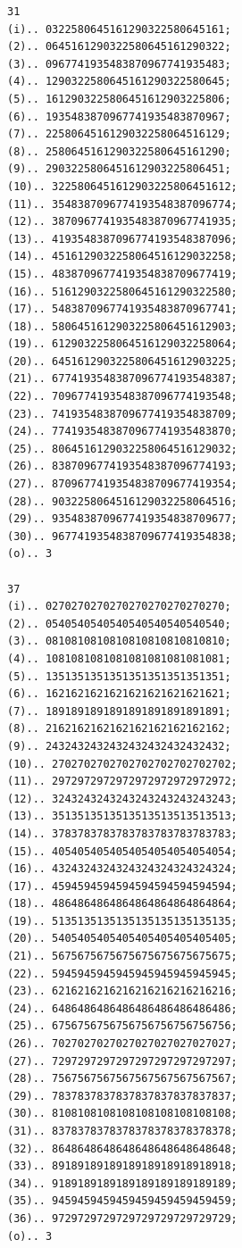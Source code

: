 \documentclass[10pt,a4paper]{article}
\begin{document}
\begin{verbatim}
31
(i).. 0322580645161290322580645161;
(2).. 0645161290322580645161290322;
(3).. 0967741935483870967741935483;
(4).. 1290322580645161290322580645;
(5).. 1612903225806451612903225806;
(6).. 1935483870967741935483870967;
(7).. 2258064516129032258064516129;
(8).. 2580645161290322580645161290;
(9).. 2903225806451612903225806451;
(10).. 3225806451612903225806451612;
(11).. 3548387096774193548387096774;
(12).. 3870967741935483870967741935;
(13).. 4193548387096774193548387096;
(14).. 4516129032258064516129032258;
(15).. 4838709677419354838709677419;
(16).. 5161290322580645161290322580;
(17).. 5483870967741935483870967741;
(18).. 5806451612903225806451612903;
(19).. 6129032258064516129032258064;
(20).. 6451612903225806451612903225;
(21).. 6774193548387096774193548387;
(22).. 7096774193548387096774193548;
(23).. 7419354838709677419354838709;
(24).. 7741935483870967741935483870;
(25).. 8064516129032258064516129032;
(26).. 8387096774193548387096774193;
(27).. 8709677419354838709677419354;
(28).. 9032258064516129032258064516;
(29).. 9354838709677419354838709677;
(30).. 9677419354838709677419354838;
(o).. 3

37
(i).. 0270270270270270270270270270;
(2).. 0540540540540540540540540540;
(3).. 0810810810810810810810810810;
(4).. 1081081081081081081081081081;
(5).. 1351351351351351351351351351;
(6).. 1621621621621621621621621621;
(7).. 1891891891891891891891891891;
(8).. 2162162162162162162162162162;
(9).. 2432432432432432432432432432;
(10).. 2702702702702702702702702702;
(11).. 2972972972972972972972972972;
(12).. 3243243243243243243243243243;
(13).. 3513513513513513513513513513;
(14).. 3783783783783783783783783783;
(15).. 4054054054054054054054054054;
(16).. 4324324324324324324324324324;
(17).. 4594594594594594594594594594;
(18).. 4864864864864864864864864864;
(19).. 5135135135135135135135135135;
(20).. 5405405405405405405405405405;
(21).. 5675675675675675675675675675;
(22).. 5945945945945945945945945945;
(23).. 6216216216216216216216216216;
(24).. 6486486486486486486486486486;
(25).. 6756756756756756756756756756;
(26).. 7027027027027027027027027027;
(27).. 7297297297297297297297297297;
(28).. 7567567567567567567567567567;
(29).. 7837837837837837837837837837;
(30).. 8108108108108108108108108108;
(31).. 8378378378378378378378378378;
(32).. 8648648648648648648648648648;
(33).. 8918918918918918918918918918;
(34).. 9189189189189189189189189189;
(35).. 9459459459459459459459459459;
(36).. 9729729729729729729729729729;
(o).. 3
\end{verbatim}
\end{document}
